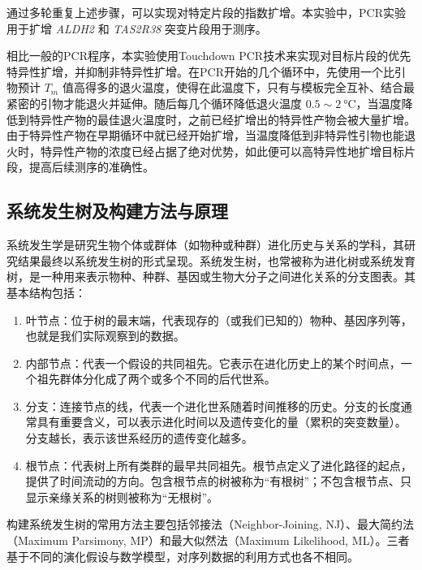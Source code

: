 \documentclass[10pt]{article}
\begin{document}
通过多轮重复上述步骤，可以实现对特定片段的指数扩增。本实验中，PCR实验用于扩增 \textit{ALDH2} 和 \textit{TAS2R38} 突变片段用于测序。

相比一般的PCR程序，本实验使用Touchdown PCR技术来实现对目标片段的优先特异性扩增，并抑制非特异性扩增。在PCR开始的几个循环中，先使用一个比引物预计 $T_m$ 值高得多的退火温度，使得在此温度下，只有与模板完全互补、结合最紧密的引物才能退火并延伸。随后每几个循环降低退火温度 $0.5\sim \qty{2}{\celsius}$，当温度降低到特异性产物的最佳退火温度时，之前已经扩增出的特异性产物会被大量扩增。由于特异性产物在早期循环中就已经开始扩增，当温度降低到非特异性引物也能退火时，特异性产物的浓度已经占据了绝对优势，如此便可以高特异性地扩增目标片段，提高后续测序的准确性。

\subsection{系统发生树及构建方法与原理}
系统发生学是研究生物个体或群体（如物种或种群）进化历史与关系的学科，其研究结果最终以系统发生树的形式呈现。系统发生树，也常被称为进化树或系统发育树，是一种用来表示物种、种群、基因或生物大分子之间进化关系的分支图表。其基本结构包括：
\begin{enumerate}
    \item 叶节点：位于树的最末端，代表现存的（或我们已知的）物种、基因序列等，也就是我们实际观察到的数据。
    \item 内部节点：代表一个假设的共同祖先。它表示在进化历史上的某个时间点，一个祖先群体分化成了两个或多个不同的后代世系。
    \item 分支：连接节点的线，代表一个进化世系随着时间推移的历史。分支的长度通常具有重要含义，可以表示进化时间以及遗传变化的量（累积的突变数量）。分支越长，表示该世系经历的遗传变化越多。
    \item 根节点：代表树上所有类群的最早共同祖先。根节点定义了进化路径的起点，提供了时间流动的方向。包含根节点的树被称为“有根树”；不包含根节点、只显示亲缘关系的树则被称为“无根树”。
\end{enumerate}

构建系统发生树的常用方法主要包括邻接法（Neighbor-Joining, NJ）、最大简约法（Maximum Parsimony, MP）和最大似然法（Maximum Likelihood, ML）。三者基于不同的演化假设与数学模型，对序列数据的利用方式也各不相同。
\end{document}
